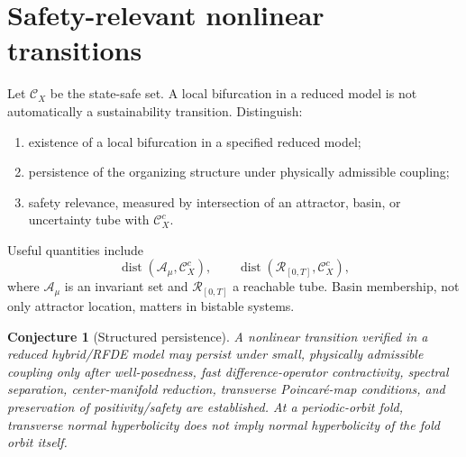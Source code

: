 \documentclass[11pt]{article}
\newtheorem{conjecture}{Conjecture}
\begin{document}
\section{Safety-relevant nonlinear transitions}
Let $\mathcal C_X$ be the state-safe set. A local bifurcation in a reduced model is not automatically a sustainability transition. Distinguish:
\begin{enumerate}
\item existence of a local bifurcation in a specified reduced model;
\item persistence of the organizing structure under physically admissible coupling;
\item safety relevance, measured by intersection of an attractor, basin, or uncertainty tube with $\mathcal C_X^c$.
\end{enumerate}
Useful quantities include
\[
\operatorname{dist}(\mathcal A_\mu,\mathcal C_X^c),
\qquad
\operatorname{dist}(\mathcal R_{[0,T]},\mathcal C_X^c),
\]
where $\mathcal A_\mu$ is an invariant set and $\mathcal R_{[0,T]}$ a reachable tube. Basin membership, not only attractor location, matters in bistable systems.

\begin{conjecture}[Structured persistence]
A nonlinear transition verified in a reduced hybrid/RFDE model may persist under small, physically admissible coupling only after well-posedness, fast difference-operator contractivity, spectral separation, center-manifold reduction, transverse Poincar\'e-map conditions, and preservation of positivity/safety are established. At a periodic-orbit fold, transverse normal hyperbolicity does not imply normal hyperbolicity of the fold orbit itself.
\end{conjecture}
\end{document}

